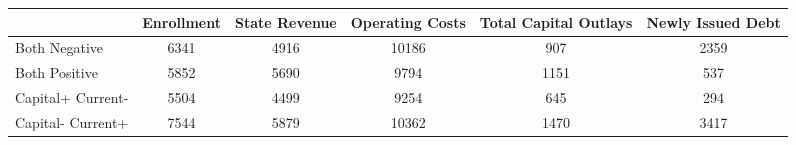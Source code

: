 
\begin{tabularx}{\linewidth}{@{}lCCCCC@{}}

\toprule
{}&{Enrollment}&{State Revenue}&{Operating Costs}&{Total Capital Outlays}&{Newly Issued Debt} \tabularnewline
\midrule \addlinespace[\belowrulesep]
Both Negative&6341&4916&10186&907&2359 \tabularnewline
Both Positive&5852&5690&9794&1151&537 \tabularnewline
Capital+ Current-&5504&4499&9254&645&294 \tabularnewline
Capital- Current+&7544&5879&10362&1470&3417 \tabularnewline
\bottomrule 

\end{tabularx}
